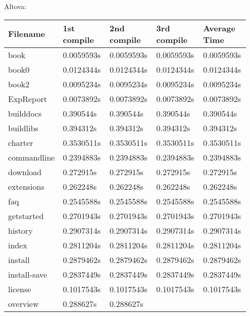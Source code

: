 \documentclass[letterpaper,10pt,titlepage]{article}
\begin{document}
Altova:
\begin{longtable}{ | p{0.15\linewidth} | p{0.2\linewidth} | p{0.2\linewidth} | p{0.2\linewidth} | p{0.2\linewidth} |}\hline
  Filename & 1st compile & 2nd compile  & 3rd compile & Average Time \\ \hline
  	book &
    0.0059593s &
    0.0059593s &
    0.0059593s &
    0.0059593s \\
  \hline
  	book0 &
    0.0124344s &
    0.0124344s &
    0.0124344s &
    0.0124344s\\
  \hline
    book2 &
    0.0095234s &
    0.0095234s &
    0.0095234s &
    0.0095234s\\
    \hline
    ExpReport &
    0.0073892s &
    0.0073892s &
    0.0073892s &
    0.0073892s\\
    \hline
    builddocs &
    0.390544s &
    0.390544s &
    0.390544s &
    0.390544s \\
    \hline
    buildlibs &
    0.394312s &
    0.394312s &
    0.394312s &
    0.394312s \\
    \hline
    charter &
    0.3530511s &
    0.3530511s &
    0.3530511s &
    0.3530511s \\
    \hline
    commandline &
    0.2394883s &
    0.2394883s &
    0.2394883s &
    0.2394883s \\
    \hline
    download &
    0.272915s &
    0.272915s &
    0.272915s &
    0.272915s \\
    \hline
    extensions &
    0.262248s &
    0.262248s &
    0.262248s &
    0.262248s \\
    \hline
    faq &
    0.2545588s &
    0.2545588s &
    0.2545588s &
    0.2545588s \\
    \hline
    getstarted &
    0.2701943s &
    0.2701943s &
    0.2701943s &
    0.2701943s \\
    \hline
    history &
    0.2907314s &
    0.2907314s &
    0.2907314s &
    0.2907314s \\
    \hline
    index &
    0.2811204s &
    0.2811204s &
    0.2811204s &
    0.2811204s \\
    \hline
    install &
    0.2879462s &
    0.2879462s &
    0.2879462s &
    0.2879462s \\
    \hline
    install-save &
    0.2837449s &
    0.2837449s &
    0.2837449s &
    0.2837449s \\
    \hline
    license &
    0.1017543s &
    0.1017543s &
    0.1017543s &
    0.1017543s \\
    \hline
    overview &
    0.288627s &
    0.288627s &

\end{longtable}
\end{document}
